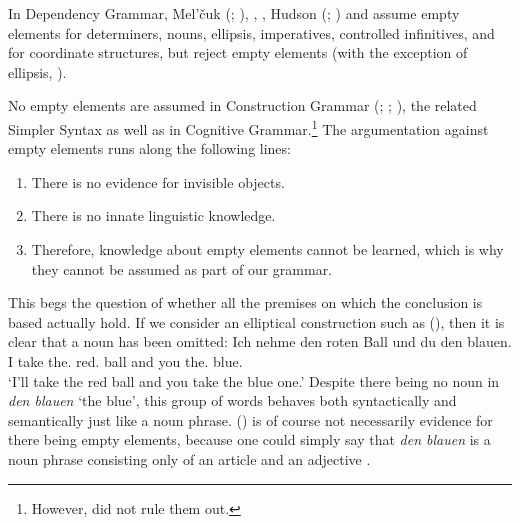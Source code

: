 In Dependency Grammar, Mel'čuk (\citeyear[]{Melcuk88a-u}; \citeyear[]{Melcuk2003a-u}),
\citet[]{Starosta88a-u}, \citet[--472]{Eroms2000a}, Hudson (\citeyear[Section~3.7]{Hudson2007a-u}; \citeyear[]{Hudson2010a-u}) and
\citet{Engel2014a} assume empty elements for determiners, nouns, ellipsis, imperatives, controlled infinitives, and for coordinate
structures, but \citet[]{GO2009a} reject empty elements (with the exception of ellipsis, \citealp{Osborne2016a-u}).

No empty elements are assumed in Construction Grammar\indexcxg\label{Seite-leere-Elemente-CxG} (\citealp[--50]{MR2001a}; \citealp[]{Goldberg2003b}; \citealp[]{Goldberg2006a}), the related Simpler Syntax \citep{CJ2005a} as well as in Cognitive Grammar.\footnote{
  However, \citet[]{Fillmore88a} did not rule them out.
} 
The argumentation against empty elements runs along the following lines:
\begin{enumerate}
\item There is no evidence for invisible objects.
\item There is no innate linguistic knowledge.
\item Therefore, knowledge about empty elements cannot be learned, which is why they cannot be assumed
as part of our grammar.
\end{enumerate}
This begs the question of whether all the premises on which the conclusion is based actually hold. If we consider an elliptical
construction such as (), then it is clear that a noun has been omitted:
\ea
\gll Ich nehme den roten Ball und du den blauen.\\
	 I take the.\acc{} red.\acc{} ball and you the.\acc{} blue.\acc{}\\
\glt `I'll take the red ball and you take the blue one.'
\z
Despite there being no noun in \emph{den blauen} `the blue', this group of words behaves both syntactically and semantically just like a noun
phrase. () is of course not necessarily evidence for there being empty elements, because one could simply say that \emph{den blauen}
is a noun phrase consisting only of an article and an adjective \citep{Wunderlich87d}. 

